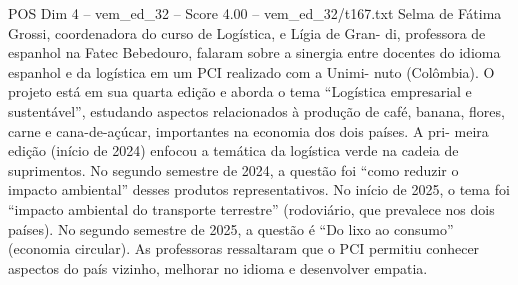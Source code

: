 \begin{textsample}{POS Dim 4 – vem\_ed\_32 – Score 4.00 – vem\_ed\_32/t167.txt}
Selma de Fátima Grossi, coordenadora do curso de Logística, e Lígia de Gran- di, professora de espanhol na Fatec Bebedouro, falaram sobre a sinergia entre docentes do idioma espanhol e da logística em um PCI realizado com a Unimi- nuto (Colômbia).
O projeto está em sua quarta edição e aborda o tema “Logística empresarial e sustentável”, estudando aspectos relacionados à produção de café, banana, flores, carne e cana-de-açúcar, importantes na economia dos dois países.
A pri- meira edição (início de 2024) enfocou a temática da logística verde na cadeia de suprimentos.
No segundo semestre de 2024, a questão foi “como reduzir o impacto ambiental” desses produtos representativos.
No início de 2025, o tema foi “impacto ambiental do transporte terrestre” (rodoviário, que prevalece nos dois países).
No segundo semestre de 2025, a questão é “Do lixo ao consumo” (economia circular).
As professoras ressaltaram que o PCI permitiu conhecer aspectos do país vizinho, melhorar no idioma e desenvolver empatia.

\end{textsample}
